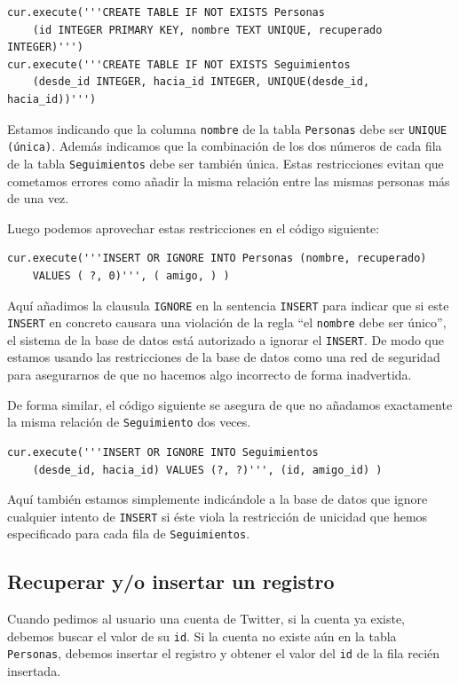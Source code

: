 \beforeverb
\begin{verbatim}
cur.execute('''CREATE TABLE IF NOT EXISTS Personas 
    (id INTEGER PRIMARY KEY, nombre TEXT UNIQUE, recuperado INTEGER)''')
cur.execute('''CREATE TABLE IF NOT EXISTS Seguimientos 
    (desde_id INTEGER, hacia_id INTEGER, UNIQUE(desde_id, hacia_id))''')
\end{verbatim}
\afterverb
%
Estamos indicando que la columna {\tt nombre} de la tabla {\tt Personas} debe ser
{\tt UNIQUE (única)}. Además indicamos que la combinación de los dos números
de cada fila de la tabla {\tt Seguimientos} debe ser también única. Estas restricciones
evitan que cometamos errores como añadir la misma relación entre las mismas personas
más de una vez.

Luego podemos aprovechar estas restricciones en el código siguiente:

\beforeverb
\begin{verbatim}
cur.execute('''INSERT OR IGNORE INTO Personas (nombre, recuperado) 
    VALUES ( ?, 0)''', ( amigo, ) )
\end{verbatim}
\afterverb
%
Aquí añadimos la clausula {\tt IGNORE} en la sentencia {\tt INSERT} para indicar
que si este {\tt INSERT} en concreto causara una violación de la regla
``el {\tt nombre} debe ser único'', el sistema de la base de datos está autorizado
a ignorar el {\tt INSERT}. De modo que estamos usando las restricciones de la base de datos
como una red de seguridad para asegurarnos de que no hacemos algo incorrecto de forma inadvertida.

De forma similar, el código siguiente se asegura de que no añadamos exactamente
la misma relación de {\tt Seguimiento} dos veces.

\beforeverb
\begin{verbatim}
cur.execute('''INSERT OR IGNORE INTO Seguimientos 
    (desde_id, hacia_id) VALUES (?, ?)''', (id, amigo_id) )
\end{verbatim}
\afterverb
%
Aquí también estamos simplemente indicándole a la base de datos que ignore cualquier intento
de {\tt INSERT} si éste viola la restricción de unicidad
que hemos especificado para cada fila de {\tt Seguimientos}.

\subsection{Recuperar y/o insertar un registro}

Cuando pedimos al usuario una cuenta de Twitter, si la cuenta ya
existe, debemos buscar el valor de su {\tt id}. Si la cuenta
no existe aún en la tabla {\tt Personas}, debemos insertar
el registro y obtener el valor del {\tt id} de la fila
recién insertada.

